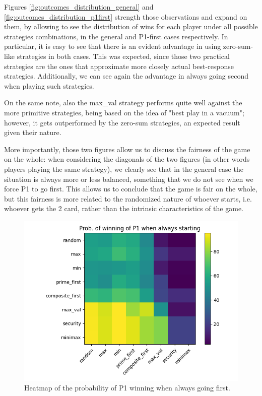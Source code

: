 Figures \ref{fig:outcomes_distribution_general} and \ref{fig:outcomes_distribution_p1first} strength those observations and expand on them, by allowing to see the distribution of wins for each player under all possible strategies combinations, in the general and P1-first cases respectively.
In particular, it is easy to see that there is an evident advantage in using zero-sum-like strategies in both cases. This was expected, since those two practical strategies are the ones that approximate more closely actual best-response strategies.
Additionally, we can see again the advantage in always going second when playing such strategies.

On the same note, also the max\_val	strategy performs quite well against the more primitive strategies, being based on the idea of "best play in a vacuum"; however, it gets outperformed by the zero-sum strategies, an expected result given their nature.

More importantly, those two figures allow us to discuss the fairness of the game on the whole: when considering the diagonals of the two figures (in other words players playing the same strategy), we clearly see that in the general case the situation is always more or less balanced, something that we do not see when we force P1 to go first. This allows us to conclude that the game is fair on the whole, but this fairness is more related to the randomized nature of whoever starts, i.e. whoever gets the 2 card, rather than the intrinsic characteristics of the game.

\begin{figure}
	\centering
	\includegraphics[width=1\linewidth]{img/prob_p1first.png}
	\caption{Heatmap of the probability of P1 winning when always going first.}
	\label{fig:prob_p1first}
\end{figure}

